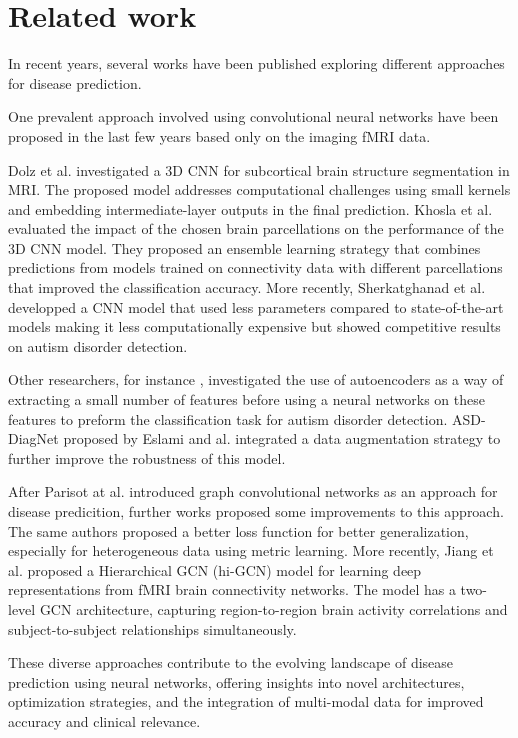 \section{Related work}

\quad In recent years, several works have been published exploring different approaches for disease prediction.

One prevalent approach involved using convolutional neural networks have been proposed in the last few years based only on the imaging fMRI data. 

Dolz et al. \cite{Dolz2018} investigated a 3D CNN for subcortical brain structure segmentation in MRI. The proposed model addresses computational challenges using small kernels and embedding intermediate-layer outputs in the final prediction. Khosla et al.\cite{Khosla2019} evaluated the impact of the chosen brain parcellations on the performance of the 3D CNN model. They proposed an ensemble learning strategy that combines predictions from models trained on connectivity data with different parcellations that improved the classification accuracy. More recently, Sherkatghanad et al. developped a CNN model that used less parameters compared to state-of-the-art models making it less computationally expensive but showed competitive results on autism disorder detection.

Other researchers, for instance \cite{Kong2019}, investigated the use of autoencoders as a way of extracting a small number of features before using a neural networks on these features to preform the classification task for autism disorder detection. ASD-DiagNet proposed by Eslami and al. \cite{Eslami2019} integrated a data augmentation strategy to further improve the robustness of this model.

After Parisot at al. introduced graph convolutional networks as an approach for disease predicition, further works proposed some improvements to this approach. The same authors proposed a better loss function for better generalization, especially for heterogeneous data using metric learning. More recently, Jiang et al. \cite{Jiang2020} proposed a Hierarchical GCN (hi-GCN) model for learning deep representations from fMRI brain connectivity networks. The model has a two-level GCN architecture, capturing region-to-region brain activity correlations and subject-to-subject relationships simultaneously.

These diverse approaches contribute to the evolving landscape of disease prediction using neural networks, offering insights into novel architectures, optimization strategies, and the integration of multi-modal data for improved accuracy and clinical relevance.
